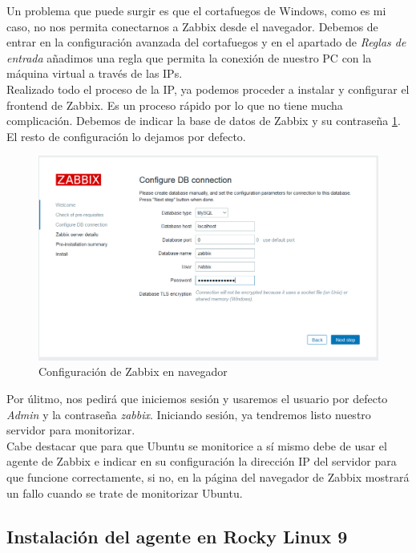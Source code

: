 Un problema que puede surgir es que el cortafuegos de Windows, como es mi caso, no nos permita conectarnos a Zabbix desde el navegador. Debemos de entrar en la configuración avanzada del cortafuegos y en el apartado de \textit{Reglas de entrada} añadimos una regla que permita la conexión de nuestro PC con la máquina virtual a través de las IPs.\\

Realizado todo el proceso de la IP, ya podemos proceder a instalar y configurar el frontend de Zabbix. Es un proceso rápido por lo que no tiene mucha complicación. Debemos de indicar la base de datos de Zabbix y su contraseña \ref{fig:conf-frontend}. El resto de configuración lo dejamos por defecto.

\begin{figure}[H]
  \centering
  \includegraphics[scale=0.6]{Captura12}
  \caption{Configuración de Zabbix en navegador}
  \label{fig:conf-frontend}
\end{figure}

Por úlitmo, nos pedirá que iniciemos sesión y usaremos el usuario por defecto \textit{Admin} y la contraseña \textit{zabbix}. Iniciando sesión, ya tendremos listo nuestro servidor para monitorizar.\\

Cabe destacar que para que Ubuntu se monitorice a sí mismo debe de usar el agente de Zabbix e indicar en su configuración la dirección IP del servidor para que funcione correctamente, si no, en la página del navegador de Zabbix mostrará un fallo cuando se trate de monitorizar Ubuntu.

\newpage
\subsection{Instalación del agente en Rocky Linux 9}

